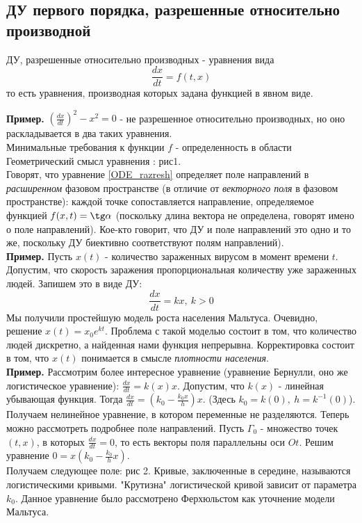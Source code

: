 \subsection{ДУ первого порядка, разрешенные относительно производной}
\begin{defin}
ДУ, разрешенные относительно производных - уравнения вида 
\begin{equation}
    \frac{dx}{dt}=f(t,x) \label{ODE_razresh}
\end{equation}
то есть уравнения, производная которых задана функцией в явном виде.
\end{defin}
\textbf{Пример.} $(\frac{dx}{dt})^2-x^2=0$ - не разрешенное
относительно производных, но оно раскладывается в два таких уравнения. \\
Минимальные требования к функции $f$ - определенность в области\\
Геометрический смысл уравнения \label{ODE_razresh}: рис1. \\
Говорят, что уравнение \ref{ODE_razresh} определяет поле направлений в 
\textit{расширенном} фазовом пространстве (в отличие от \textit{векторного
поля} в фазовом пространстве):
каждой точке сопоставляется направление, определяемое функцией
$f(x,t)=\tg\alpha$ (поскольку длина вектора не определена, говорят имено о 
поле направлений). Кое-кто говорит, что ДУ и поле направлений это одно и то 
же, поскольку ДУ биективно соответствуют полям направлений).\\
\textbf{Пример.} Пусть $x(t)$ - количество зараженных вирусом
в момент времени $t$. Допустим, что скорость заражения пропорциональная
количеству уже зараженных людей. Запишем это в виде ДУ:
$$\frac{dx}{dt}=kx,~k>0$$
Мы получили простейшую модель роста населения Мальтуса. Очевидно, решение
$x(t)=x_0e^{kt}$. Проблема с такой моделью состоит в том, что количество 
людей дискретно, а найденная нами функция непрерывна. Корректировка состоит
в том, что $x(t)$ понимается в смысле \textit{плотности населения}. \\
\textbf{Пример.} Рассмотрим более интересное уравнение (уравнение Бернулли,
оно же логистическое уравнение): 
$\frac{dx}{dt}=k(x)x$. Допустим, что $k(x)$ - линейная убывающая функция. 
Тогда $\frac{dx}{dt}=(k_0-\frac{k_0x}{h})x$. (Здесь $k_0=k(0),~h=k^{-1}(0)$).
Получаем нелинейное уравнение, в котором переменные не разделяются. Теперь
можно рассмотреть подробнее поле направлений. Пусть $\Gamma_0$ - множество
точек  $(t,x)$, в которых  $\frac{dx}{dt}=0$, то есть векторы поля 
параллельны оси $Ot$. Решим уравнение  $0=x(k_0-\frac{k_0}{h}x)$. \\
Получаем следующее поле: рис 2. Кривые, заключенные в середине, называются
логистическими кривыми. "Крутизна" логистической кривой зависит от параметра 
$k_0$. Данное уравнение было рассмотрено Ферхюльстом как уточнение модели
Мальтуса. 



